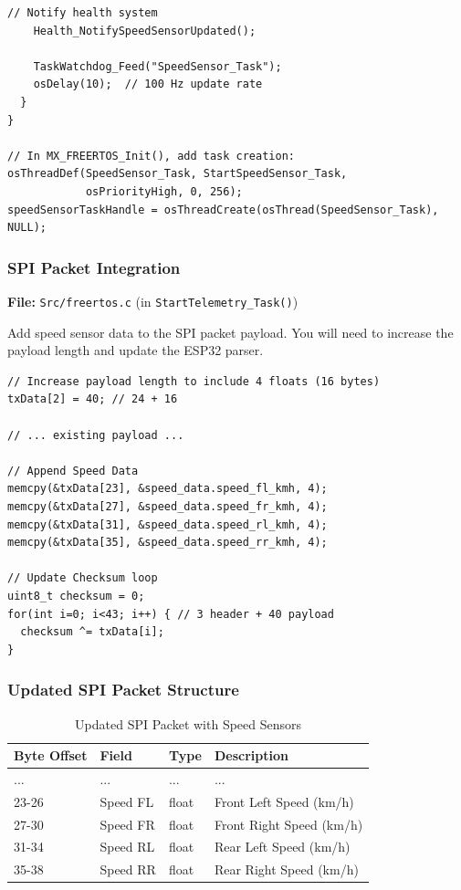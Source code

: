\documentclass[11pt,a4paper]{article}
\begin{document}
\begin{lstlisting}[caption=Speed Sensor Task Implementation, label=lst:speedtask]
    // Notify health system
    Health_NotifySpeedSensorUpdated();
    
    TaskWatchdog_Feed("SpeedSensor_Task");
    osDelay(10);  // 100 Hz update rate
  }
}

// In MX_FREERTOS_Init(), add task creation:
osThreadDef(SpeedSensor_Task, StartSpeedSensor_Task, 
            osPriorityHigh, 0, 256);
speedSensorTaskHandle = osThreadCreate(osThread(SpeedSensor_Task), NULL);
\end{lstlisting}

\subsubsection{SPI Packet Integration}

\textbf{File:} \texttt{Src/freertos.c} (in \texttt{StartTelemetry\_Task()})

Add speed sensor data to the SPI packet payload. You will need to increase the payload length and update the ESP32 parser.

\begin{lstlisting}[caption=SPI Packet with Speed Data, label=lst:speedspi]
// Increase payload length to include 4 floats (16 bytes)
txData[2] = 40; // 24 + 16

// ... existing payload ...

// Append Speed Data
memcpy(&txData[23], &speed_data.speed_fl_kmh, 4);
memcpy(&txData[27], &speed_data.speed_fr_kmh, 4);
memcpy(&txData[31], &speed_data.speed_rl_kmh, 4);
memcpy(&txData[35], &speed_data.speed_rr_kmh, 4);

// Update Checksum loop
uint8_t checksum = 0;
for(int i=0; i<43; i++) { // 3 header + 40 payload
  checksum ^= txData[i];
}
\end{lstlisting}

\subsubsection{Updated SPI Packet Structure}

\begin{table}[H]
\centering
\begin{tabular}{@{}llll@{}}
\toprule
\textbf{Byte Offset} & \textbf{Field} & \textbf{Type} & \textbf{Description} \\
\midrule
... & ... & ... & ... \\
23-26 & Speed FL & float & Front Left Speed (km/h) \\
27-30 & Speed FR & float & Front Right Speed (km/h) \\
31-34 & Speed RL & float & Rear Left Speed (km/h) \\
35-38 & Speed RR & float & Rear Right Speed (km/h) \\
\bottomrule
\end{tabular}
\caption{Updated SPI Packet with Speed Sensors}
\end{table}
\end{document}
